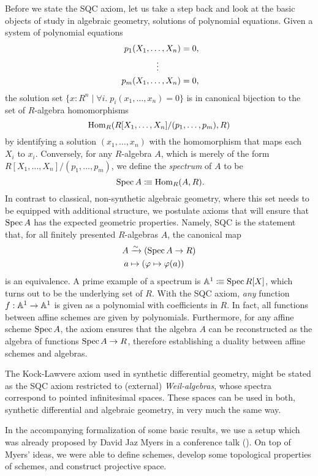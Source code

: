 Before we state the SQC axiom, let us take a step back and look at the basic objects of study in algebraic geometry,
solutions of polynomial equations.
Given a system of polynomial equations
\begin{align*}
  p_1(X_1, \dots, X_n) &= 0\rlap{,} \\
  \vdots\quad\quad\;\;   \\
  p_m(X_1, \dots, X_n) &= 0\rlap{,}
\end{align*}
the solution set
$\{ x : R^n \mid \forall i.\; p_i(x_1, \dots, x_n) = 0 \}$
is in canonical bijection to the set of $R$-algebra homomorphisms
\[ \mathrm{Hom}_R(R[X_1, \dots, X_n]/(p_1, \dots, p_m), R) \]
by identifying a solution $(x_1,\dots,x_n)$ with the homomorphism that maps each $X_i$ to $x_i$.
Conversely, for any $R$-algebra $A$, which is merely of the form $R[X_1, \dots, X_n]/(p_1, \dots, p_m)$,
we define the \emph{spectrum} of $A$ to be
\[
  \Spec A \colonequiv \Hom_R(A, R)
  \rlap{.}
\]
In contrast to classical, non-synthetic algebraic geometry,
where this set needs to be equipped with additional structure,
we postulate axioms that will ensure that $\operatorname{Spec} A$ has the expected geometric properties.
Namely, SQC is the statement that, for all finitely presented $R$-algebras $A$, the canonical map
  \begin{align*}
    A&\xrightarrow{\sim} (\operatorname{Spec} A\to R) \\
    a&\mapsto (\varphi\mapsto \varphi(a))
  \end{align*}
is an equivalence.
A prime example of a spectrum is $\mathbb{A}^1\vcentcolon\mspace{-1.2mu}\equiv \operatorname{Spec} R[X]$,
which turns out to be the underlying set of $R$.
With the SQC axiom,
\emph{any} function $f:\mathbb{A}^1\to \mathbb{A}^1$ is given as a polynomial with coefficients in $R$.
In fact, all functions between affine schemes are given by polynomials.
Furthermore, for any affine scheme $\operatorname{Spec} A$,
the axiom ensures that
the algebra $A$ can be reconstructed as the algebra of functions $\operatorname{Spec} A \to R$,
therefore establishing a duality between affine schemes and algebras.

The Kock-Lawvere axiom used in synthetic differential geometry,
might be stated as the SQC axiom restricted to (external) \emph{Weil-algebras},
whose spectra correspond to pointed infinitesimal spaces.
These spaces can be used in both, synthetic differential and algebraic geometry,
in very much the same way.

In the accompanying formalization \cite{formalization} of some basic results,
we use a setup which was already proposed by David Jaz Myers
in a conference talk (\cite{myers-talk1, myers-talk2}).
On top of Myers' ideas,
we were able to define schemes, develop some topological properties of schemes,
and construct projective space.

